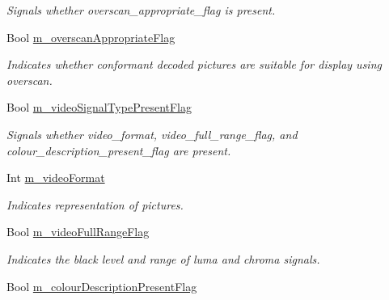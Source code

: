 \begin{DoxyCompactItemize}
\begin{DoxyCompactList}\small\item\em Signals whether overscan\+\_\+appropriate\+\_\+flag is present. \end{DoxyCompactList}\item 
\mbox{\label{class_t_enc_cfg_ac952ebb5046230a0e71e2b71c162fa75}} 
Bool \hyperlink{class_t_enc_cfg_ac952ebb5046230a0e71e2b71c162fa75}{m\+\_\+overscan\+Appropriate\+Flag}
\begin{DoxyCompactList}\small\item\em Indicates whether conformant decoded pictures are suitable for display using overscan. \end{DoxyCompactList}\item 
\mbox{\label{class_t_enc_cfg_a9383f8b34e4da68a10d7e1eea69a288a}} 
Bool \hyperlink{class_t_enc_cfg_a9383f8b34e4da68a10d7e1eea69a288a}{m\+\_\+video\+Signal\+Type\+Present\+Flag}
\begin{DoxyCompactList}\small\item\em Signals whether video\+\_\+format, video\+\_\+full\+\_\+range\+\_\+flag, and colour\+\_\+description\+\_\+present\+\_\+flag are present. \end{DoxyCompactList}\item 
\mbox{\label{class_t_enc_cfg_a13667c020419afc2708c0cf8d1341840}} 
Int \hyperlink{class_t_enc_cfg_a13667c020419afc2708c0cf8d1341840}{m\+\_\+video\+Format}
\begin{DoxyCompactList}\small\item\em Indicates representation of pictures. \end{DoxyCompactList}\item 
\mbox{\label{class_t_enc_cfg_a78b4543cca7ca37ad580e4b7d5e91a5a}} 
Bool \hyperlink{class_t_enc_cfg_a78b4543cca7ca37ad580e4b7d5e91a5a}{m\+\_\+video\+Full\+Range\+Flag}
\begin{DoxyCompactList}\small\item\em Indicates the black level and range of luma and chroma signals. \end{DoxyCompactList}\item 
\mbox{\label{class_t_enc_cfg_a7df4c78f1c77a71e24dc2a53c3e6147c}} 
Bool \hyperlink{class_t_enc_cfg_a7df4c78f1c77a71e24dc2a53c3e6147c}{m\+\_\+colour\+Description\+Present\+Flag}

\end{DoxyCompactItemize}
